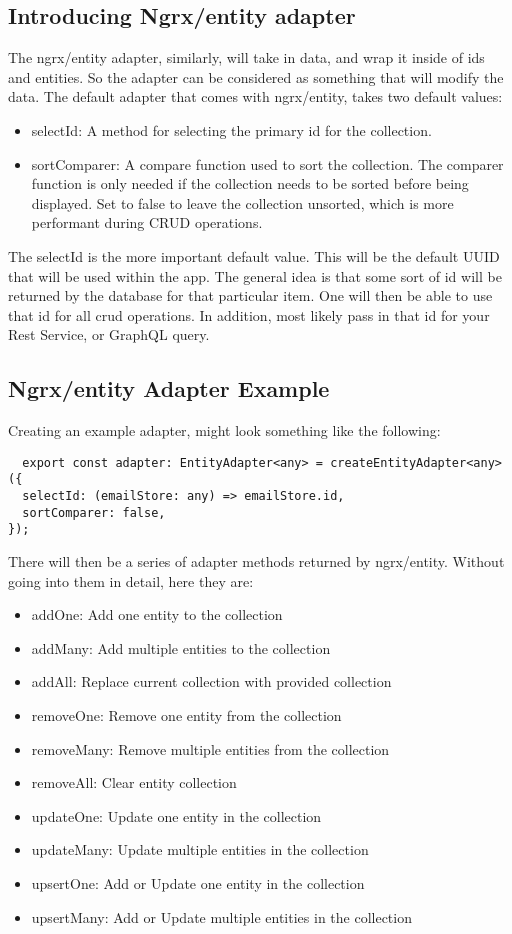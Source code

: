 \subsection{ Introducing Ngrx/entity adapter }
The ngrx/entity adapter, similarly, will take in data, and wrap it inside of ids
and entities. So the adapter can be considered as something that will modify
the data. The default adapter that comes with ngrx/entity, takes two default
values:
\begin{itemize}
  \item selectId: A method for selecting the primary id for the collection.
  \item sortComparer: A compare function used to sort the collection. The
  comparer function is only needed if the collection needs to be sorted before
  being displayed. Set to false to leave the collection unsorted, which is more
  performant during CRUD operations.
\end{itemize}

The selectId is the more important default value. This will be the default UUID
that will be used within the app. The general idea is that some sort of id will
be returned by the database for that particular item. One will then be able to
use that id for all crud operations. In addition, most likely pass in that id
for your Rest Service, or GraphQL query.

\subsection{ Ngrx/entity Adapter Example }
Creating an example adapter, might look something like the following:
\begin{verbatim}
  export const adapter: EntityAdapter<any> = createEntityAdapter<any>({
  selectId: (emailStore: any) => emailStore.id,
  sortComparer: false,
});
\end{verbatim}

There will then be a series of adapter methods returned by ngrx/entity. Without
going into them in detail, here they are:
\begin{itemize}
  \item addOne: Add one entity to the collection
  \item addMany: Add multiple entities to the collection
  \item addAll: Replace current collection with provided collection
  \item removeOne: Remove one entity from the collection
  \item removeMany: Remove multiple entities from the collection
  \item removeAll: Clear entity collection
  \item updateOne: Update one entity in the collection
  \item updateMany: Update multiple entities in the collection
  \item upsertOne: Add or Update one entity in the collection
  \item upsertMany: Add or Update multiple entities in the collection
\end{itemize}

